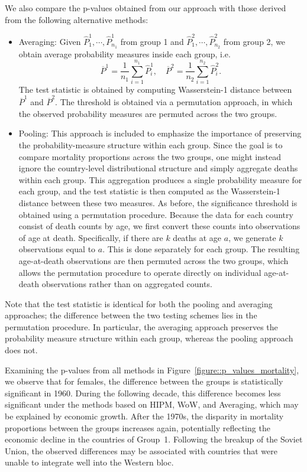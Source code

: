 We also compare the p-values obtained from our approach with those derived from the following alternative methods:
\begin{itemize}
\item Averaging: Given $\widehat{P}^1_1,\cdots, \widehat{P}^1_{n_1}$ from group 1 and $\widehat{P}^2_1,\cdots, \widehat{P}^2_{n_2}$ from group 2, we obtain average probability measures inside each group, i.e.
\[
\overline{P}^1 = \frac{1}{n_1}\sum_{i = 1}^{n_1}\widehat{P}^1_i, \quad
\overline{P}^2 = \frac{1}{n_2}\sum_{i = 1}^{n_2}\widehat{P}^2_i.
\]
The test statistic is obtained by computing Wasserstein-1 distance between $\overline{P}^1$ and $\overline{P}^2.$ The threshold is obtained via a permutation approach, in which the observed probability measures are permuted across the two groups.
\item Pooling: This approach is included to emphasize the importance of preserving the probability-measure structure within each group. Since the goal is to compare mortality proportions across the two groups, one might instead ignore the country-level distributional structure and simply aggregate deaths within each group. This aggregation produces a single probability measure for each group, and the test statistic is then computed as the Wasserstein-1 distance between these two measures. As before, the significance threshold is obtained using a permutation procedure. Because the data for each country consist of death counts by age, we first convert these counts into observations of age at death. Specifically, if there are $k$ deaths at age $a$, we generate $k$ observations equal to $a$. This is done separately for each group. The resulting age-at-death observations are then permuted across the two groups, which allows the permutation procedure to operate directly on individual age-at-death observations rather than on aggregated counts.
\end{itemize}
Note that the test statistic is identical for both the pooling and averaging approaches; the difference between the two testing schemes lies in the permutation procedure. In particular, the averaging approach preserves the probability measure structure within each group, whereas the pooling approach does not.

Examining the p-values from all methods in Figure~\ref{figure::p_values_mortality}, we observe that for females, the difference between the groups is statistically significant in 1960. During the following decade, this difference becomes less significant under the methods based on HIPM, WoW, and Averaging, which may be explained by economic growth. After the 1970s, the disparity in mortality proportions between the groups increases again, potentially reflecting the economic decline in the countries of Group~1. Following the breakup of the Soviet Union, the observed differences may be associated with countries that were unable to integrate well into the Western bloc.

